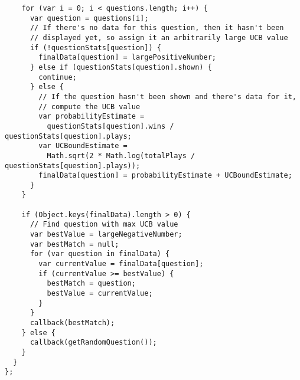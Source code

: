 \begin{lstlisting}
    for (var i = 0; i < questions.length; i++) {
      var question = questions[i];
      // If there's no data for this question, then it hasn't been
      // displayed yet, so assign it an arbitrarily large UCB value
      if (!questionStats[question]) {
        finalData[question] = largePositiveNumber;
      } else if (questionStats[question].shown) {
        continue;
      } else {
        // If the question hasn't been shown and there's data for it,
        // compute the UCB value
        var probabilityEstimate =
          questionStats[question].wins / questionStats[question].plays;
        var UCBoundEstimate =
          Math.sqrt(2 * Math.log(totalPlays / questionStats[question].plays));
        finalData[question] = probabilityEstimate + UCBoundEstimate;
      }
    }

    if (Object.keys(finalData).length > 0) {
      // Find question with max UCB value
      var bestValue = largeNegativeNumber;
      var bestMatch = null;
      for (var question in finalData) {
        var currentValue = finalData[question];
        if (currentValue >= bestValue) {
          bestMatch = question;
          bestValue = currentValue;
        }
      }
      callback(bestMatch);
    } else {
      callback(getRandomQuestion());
    }
  }
};

\end{lstlisting}
